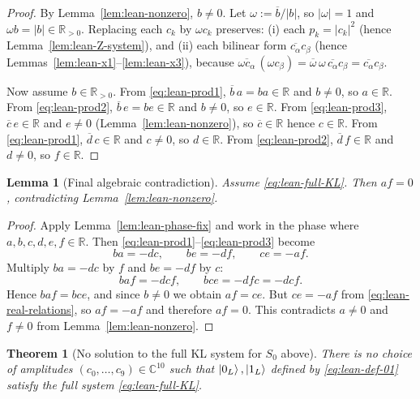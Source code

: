 \documentclass[11pt]{article}
\newtheorem{lemma}{Lemma}
\newtheorem{theorem}{Theorem}
\begin{document}
\begin{proof}
By Lemma~\ref{lem:lean-nonzero}, $b\neq 0$. Let $\omega:=\overline b/|b|$, so $|\omega|=1$ and $\omega b=|b|\in\mathbb R_{>0}$.
Replacing each $c_k$ by $\omega c_k$ preserves:
(i) each $p_k=|c_k|^2$ (hence Lemma~\ref{lem:lean-Z-system}),
and (ii) each bilinear form $\overline{c_\alpha}c_\beta$ (hence Lemmas~\ref{lem:lean-x1}--\ref{lem:lean-x3}),
because $\overline{\omega c_\alpha}\,(\omega c_\beta)=\overline\omega\,\omega\,\overline{c_\alpha}c_\beta=\overline{c_\alpha}c_\beta$.

Now assume $b\in\mathbb R_{>0}$. From \eqref{eq:lean-prod1}, $\overline b\,a=ba\in\mathbb R$ and $b\neq 0$, so $a\in\mathbb R$.
From \eqref{eq:lean-prod2}, $\overline b\,e=be\in\mathbb R$ and $b\neq 0$, so $e\in\mathbb R$.
From \eqref{eq:lean-prod3}, $\overline c\,e\in\mathbb R$ and $e\neq 0$ (Lemma~\ref{lem:lean-nonzero}), so $\overline c\in\mathbb R$ hence $c\in\mathbb R$.
From \eqref{eq:lean-prod1}, $\overline d\,c\in\mathbb R$ and $c\neq 0$, so $d\in\mathbb R$.
From \eqref{eq:lean-prod2}, $\overline d\,f\in\mathbb R$ and $d\neq 0$, so $f\in\mathbb R$.
\end{proof}

\begin{lemma}[Final algebraic contradiction]
\label{lem:lean-final-contradiction}
Assume \eqref{eq:lean-full-KL}. Then $af=0$, contradicting Lemma~\ref{lem:lean-nonzero}.
\end{lemma}

\begin{proof}
Apply Lemma~\ref{lem:lean-phase-fix} and work in the phase where $a,b,c,d,e,f\in\mathbb R$.
Then \eqref{eq:lean-prod1}--\eqref{eq:lean-prod3} become
\begin{equation}
ba=-dc,\qquad be=-df,\qquad ce=-af.
\label{eq:lean-real-relations}
\end{equation}
Multiply $ba=-dc$ by $f$ and $be=-df$ by $c$:
\[
baf=-dcf,\qquad bce=-dfc=-dcf.
\]
Hence $baf=bce$, and since $b\neq 0$ we obtain $af=ce$.
But $ce=-af$ from \eqref{eq:lean-real-relations}, so $af=-af$ and therefore $af=0$.
This contradicts $a\neq 0$ and $f\neq 0$ from Lemma~\ref{lem:lean-nonzero}.
\end{proof}

\begin{theorem}[No solution to the full KL system for $S_0$ above]
\label{thm:lean-nogo-1112226}
There is no choice of amplitudes $(c_0,\dots,c_9)\in\mathbb C^{10}$ such that
$\ket{0_L},\ket{1_L}$ defined by \eqref{eq:lean-def-01} satisfy the full system \eqref{eq:lean-full-KL}.
\end{theorem}
\end{document}
